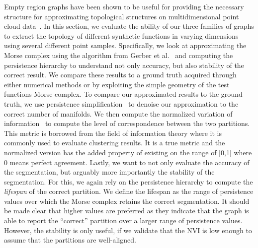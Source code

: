 Empty region graphs have been shown to be useful for providing the necessary structure for approximating topological structures on multidimensional point cloud data~\cite{BremerMaljovecSaha2014,CorreaLindstrom2011,LiebmannWeberScheuermann2018,MaljovecLiuWang2016,MaljovecWangRosen2016}.
%
In this section, we evaluate the ability of our three families of graphs to extract the topology of different synthetic functions in varying dimensions using several different point samples.
%
Specifically, we look at approximating the Morse complex using the algorithm from Gerber et al.~\cite{GerberBremerPascucci2010} and computing the persistence hierarchy to understand not only accuracy, but also stability of the correct result.
%
We compare these results to a ground truth acquired through either numerical methods or by exploiting the simple geometry of the test functions Morse complex.
%
To compare our approximated results to the ground truth, we use persistence simplification~\cite{EdelsbrunnerLetscherZomorodian2002,EdelsbrunnerHarer2008} to denoise our approximation to the correct number of manifolds.
%
We then compute the normalized variation of information~\cite{VinhEppsBailey2010} to compute the level of correspondence between the two partitions.
%
This metric is borrowed from the field of information theory where it is commonly used to evaluate clustering results.
%
It is a true metric and the normalized version has the added property of existing on the range of [0,1] where 0 means perfect agreement.
%
Lastly, we want to not only evaluate the accuracy of the segmentation, but arguably more importantly the stability of the segmentation.
%
For this, we again rely on the persistence hierarchy to compute the \textit{lifespan} of the correct partition.
%
We define the lifespan as the range of persistence values over which the Morse complex retains the correct segmentation.
%
It should be made clear that higher values are preferred as they indicate that the graph is able to report the ``correct'' partition over a larger range of persistence values.
%
However, the stability is only useful, if we validate that the NVI is low enough to assume that the partitions are well-aligned.


